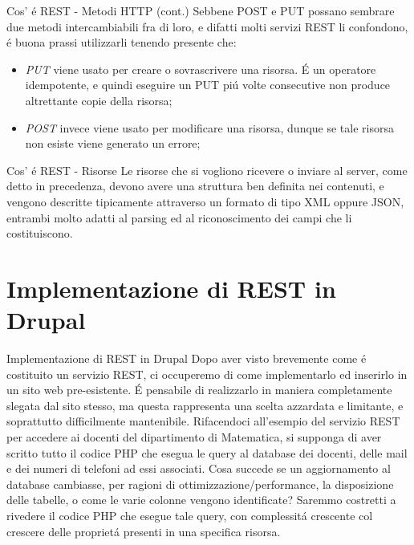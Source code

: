 \documentclass{beamer}
\begin{document}
\begin{frame}{Cos'	\'e REST - Metodi HTTP (cont.)}
Sebbene POST e PUT possano sembrare due metodi intercambiabili fra di loro, e difatti molti servizi REST li confondono, \'e
buona prassi utilizzarli tenendo presente che:
\begin{itemize}
\item \emph{PUT} viene usato per creare o sovrascrivere una risorsa. \'E un operatore idempotente, e quindi eseguire un PUT
pi\'u volte consecutive non produce altrettante copie della risorsa;
\item \emph{POST} invece viene usato per modificare una risorsa, dunque se tale risorsa non esiste viene generato un errore;
\end{itemize}
\end{frame}

\begin{frame}{Cos'	\'e REST - Risorse}
Le risorse che si vogliono ricevere o inviare al server, come detto in precedenza, devono avere una struttura ben definita nei
contenuti, e vengono descritte tipicamente attraverso un formato di tipo XML oppure JSON, entrambi molto adatti al parsing ed
al riconoscimento dei campi che li costituiscono.
\end{frame}


\section{Implementazione di REST in Drupal}
\begin{frame}{Implementazione di REST in Drupal}
Dopo aver visto brevemente come \'e costituito un servizio REST, ci occuperemo di come implementarlo ed inserirlo in un sito web
pre-esistente. \'E pensabile di realizzarlo in maniera completamente slegata dal sito stesso, ma questa rappresenta una scelta
azzardata e limitante, e soprattutto difficilmente mantenibile.
\newline
Rifacendoci all'esempio del servizio REST per accedere ai docenti del dipartimento di Matematica, si supponga di aver scritto tutto
il codice PHP che esegua le query al database dei docenti, delle mail e dei numeri di telefoni ad essi associati. Cosa succede se un aggiornamento al database cambiasse, per ragioni di ottimizzazione/performance, la disposizione delle tabelle, o come le varie
colonne vengono identificate? Saremmo costretti a rivedere il codice PHP che esegue tale query, con complessit\'a crescente
col crescere delle propriet\'a presenti in una specifica risorsa.
\end{frame}
\end{document}
